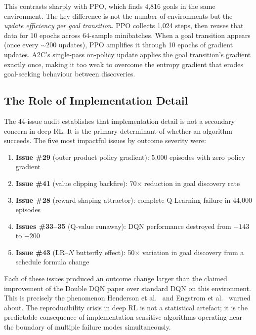 \documentclass[a4paper,12pt]{article}
\begin{document}
This contrasts sharply with PPO, which finds 4,816 goals in the same environment. The key difference is not the number of environments but the \textit{update efficiency per goal transition}. PPO collects 1,024 steps, then reuses that data for 10 epochs across 64-sample minibatches. When a goal transition appears (once every $\sim$200 updates), PPO amplifies it through 10 epochs of gradient updates. A2C's single-pass on-policy update applies the goal transition's gradient exactly once, making it too weak to overcome the entropy gradient that erodes goal-seeking behaviour between discoveries.

\subsection{The Role of Implementation Detail}

The 44-issue audit establishes that implementation detail is not a secondary concern in deep RL. It is the primary determinant of whether an algorithm succeeds. The five most impactful issues by outcome severity were:

\begin{enumerate}
  \item \textbf{Issue \#29} (outer product policy gradient): 5,000 episodes with zero policy gradient
  \item \textbf{Issue \#41} (value clipping backfire): 70$\times$ reduction in goal discovery rate
  \item \textbf{Issue \#28} (reward shaping attractor): complete Q-Learning failure in 44,000 episodes
  \item \textbf{Issues \#33--35} (Q-value runaway): DQN performance destroyed from $-143$ to $-200$
  \item \textbf{Issue \#43} (LR--$N$ butterfly effect): 50$\times$ variation in goal discovery from a schedule formula change
\end{enumerate}

Each of these issues produced an outcome change larger than the claimed improvement of the Double DQN paper over standard DQN on this environment. This is precisely the phenomenon Henderson et al.\ \cite{henderson2018deep} and Engstrom et al.\ \cite{engstrom2020implementation} warned about. The reproducibility crisis in deep RL \cite{lynnerup2020survey} is not a statistical artefact; it is the predictable consequence of implementation-sensitive algorithms operating near the boundary of multiple failure modes simultaneously.
\end{document}
